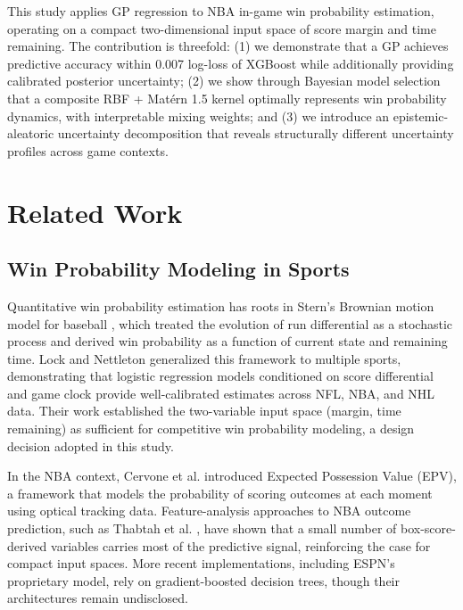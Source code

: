 \documentclass[conference]{IEEEtran}
\begin{document}
This study applies GP regression to NBA in-game win probability estimation, operating on a compact two-dimensional input space of score margin and time remaining. The contribution is threefold: (1) we demonstrate that a GP achieves predictive accuracy within 0.007 log-loss of XGBoost while additionally providing calibrated posterior uncertainty; (2) we show through Bayesian model selection that a composite RBF + Mat\'{e}rn 1.5 kernel optimally represents win probability dynamics, with interpretable mixing weights; and (3) we introduce an epistemic-aleatoric uncertainty decomposition that reveals structurally different uncertainty profiles across game contexts.

\section{Related Work}

\subsection{Win Probability Modeling in Sports}

Quantitative win probability estimation has roots in Stern's Brownian motion model for baseball \cite{stern1994}, which treated the evolution of run differential as a stochastic process and derived win probability as a function of current state and remaining time. Lock and Nettleton \cite{lock2014} generalized this framework to multiple sports, demonstrating that logistic regression models conditioned on score differential and game clock provide well-calibrated estimates across NFL, NBA, and NHL data. Their work established the two-variable input space (margin, time remaining) as sufficient for competitive win probability modeling, a design decision adopted in this study.

In the NBA context, Cervone et al. \cite{cervone2016} introduced Expected Possession Value (EPV), a framework that models the probability of scoring outcomes at each moment using optical tracking data. Feature-analysis approaches to NBA outcome prediction, such as Thabtah et al. \cite{thabtah2019}, have shown that a small number of box-score-derived variables carries most of the predictive signal, reinforcing the case for compact input spaces. More recent implementations, including ESPN's proprietary model, rely on gradient-boosted decision trees, though their architectures remain undisclosed.
\end{document}
